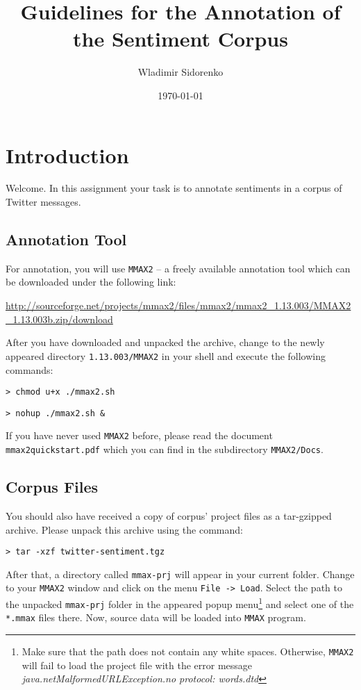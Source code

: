\documentclass[11pt,a4paper]{article}
\author{Wladimir Sidorenko}
\date{\today}
\title{Guidelines for the Annotation of the Sentiment Corpus}
\begin{document}
\maketitle{}
\section{Introduction}
Welcome. In this assignment your task is to annotate sentiments in a
corpus of Twitter messages.

\subsection{Annotation Tool}

For annotation, you will use \texttt{MMAX2} -- a freely available
annotation tool which can be downloaded under the following link:

\url{http://sourceforge.net/projects/mmax2/files/mmax2/mmax2_1.13.003/MMAX2_1.13.003b.zip/download}

After you have downloaded and unpacked the archive, change to the
newly appeared directory \texttt{1.13.003/MMAX2} in your shell and
execute the following commands:

\texttt{> chmod u+x ./mmax2.sh}

\texttt{> nohup ./mmax2.sh \&}

{\setlength{\parindent}{0pt} If you have never used \texttt{MMAX2}
  before, please read the document \texttt{mmax2quickstart.pdf} which
  you can find in the subdirectory \texttt{MMAX2/Docs}.}

\subsection{Corpus Files}

You should also have received a copy of corpus' project files as a
tar-gzipped archive.  Please unpack this archive using the
command:

\texttt{> tar -xzf twitter-sentiment.tgz}

{\setlength{\parindent}{0pt} After that, a directory called
  \texttt{mmax-prj} will appear in your current folder.  Change to
  your \texttt{MMAX2} window and click on the menu \texttt{File ->
    Load}.  Select the path to the unpacked \texttt{mmax-prj} folder
  in the appeared popup menu\footnote{Make sure that the path does not
    contain any white spaces. Otherwise, \texttt{MMAX2} will fail to
    load the project file with the error message
    \emph{java.netMalformedURLException.no protocol: words.dtd}} and
  select one of the \texttt{*.mmax} files there. Now, source data will
  be loaded into \texttt{MMAX} program.}
\end{document}
